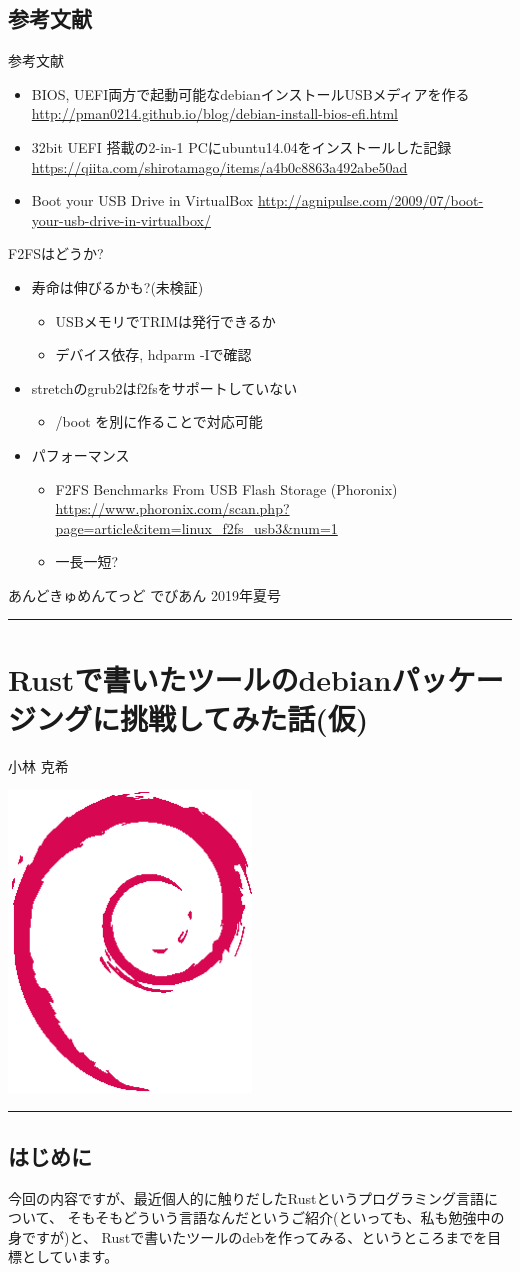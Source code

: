 \documentclass[mingoth,a4paper]{jsarticle}
\renewcommand{\dancersection}[2]{%
\newpage
あんどきゅめんてっど でびあん 2019年夏号
%
\vspace{0.1mm}\\
{\color{dancerdarkblue}\rule{\hsize}{2mm}}

%
%
\begin{minipage}[t]{0.6\hsize}
\color{dancerdarkblue}
\vspace{1cm}
\section{#1}
\hfill{}#2\\
\end{minipage}
\begin{minipage}[t]{0.4\hsize}
\vspace{-2cm}
\hfill{}\includegraphics[height=8cm]{image200502/openlogo-nd.eps}\\
\vspace{-5cm}
\end{minipage}
%
{\color{dancerlightblue}\rule{0.66\hsize}{2mm}}
%
\vspace{2cm}
}
\begin{document}
\subsection{参考文献}


参考文献
  \begin{itemize}
  \item BIOS, UEFI両方で起動可能なdebianインストールUSBメディアを作る \url{http://pman0214.github.io/blog/debian-install-bios-efi.html}
  \item 32bit UEFI 搭載の2-in-1 PCにubuntu14.04をインストールした記録 \url{https://qiita.com/shirotamago/items/a4b0c8863a492abe50ad}
   \item Boot your USB Drive in VirtualBox \url{http://agnipulse.com/2009/07/boot-your-usb-drive-in-virtualbox/}
  \end{itemize}

  F2FSはどうか?
  \begin{itemize}
  \item 寿命は伸びるかも?(未検証)
    \begin{itemize}
    \item USBメモリでTRIMは発行できるか
    \item デバイス依存, hdparm -Iで確認
    \end{itemize}
  \item stretchのgrub2はf2fsをサポートしていない
    \begin{itemize}
      \item /boot を別に作ることで対応可能
    \end{itemize}
  \item パフォーマンス
    \begin{itemize}
    \item F2FS Benchmarks From USB Flash Storage (Phoronix) \url{https://www.phoronix.com/scan.php?page=article&item=linux_f2fs_usb3&num=1}
    \item 一長一短?
    \end{itemize}
  \end{itemize}

\dancersection{\mbox{Rustで書いたツールの}\mbox{debianパッケージングに}\mbox{挑戦してみた話(仮)}}{小林 克希}

\subsection{はじめに}

今回の内容ですが、最近個人的に触りだしたRustというプログラミング言語について、
そもそもどういう言語なんだというご紹介(といっても、私も勉強中の身ですが)と、
Rustで書いたツールのdebを作ってみる、というところまでを目標としています。
\end{document}
